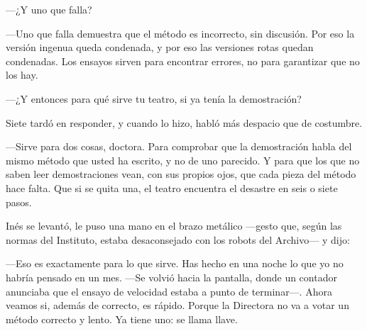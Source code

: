 ---¿Y uno que falla?

---Uno que falla demuestra que el método es incorrecto, sin discusión. Por eso la versión ingenua queda condenada, y por eso las versiones rotas quedan condenadas. Los ensayos sirven para encontrar errores, no para garantizar que no los hay.

---¿Y entonces para qué sirve tu teatro, si ya tenía la demostración?

Siete tardó en responder, y cuando lo hizo, habló más despacio que de costumbre.

---Sirve para dos cosas, doctora. Para comprobar que la demostración habla del mismo método que usted ha escrito, y no de uno parecido. Y para que los que no saben leer demostraciones vean, con sus propios ojos, que cada pieza del método hace falta. Que si se quita una, el teatro encuentra el desastre en seis o siete pasos.

Inés se levantó, le puso una mano en el brazo metálico ---gesto que, según las normas del Instituto, estaba desaconsejado con los robots del Archivo--- y dijo:

---Eso es exactamente para lo que sirve. Has hecho en una noche lo que yo no habría pensado en un mes. ---Se volvió hacia la pantalla, donde un contador anunciaba que el ensayo de velocidad estaba a punto de terminar---\nobreak. Ahora veamos si, además de correcto, es rápido. Porque la Directora no va a votar un método correcto y lento. Ya tiene uno: se llama llave.
